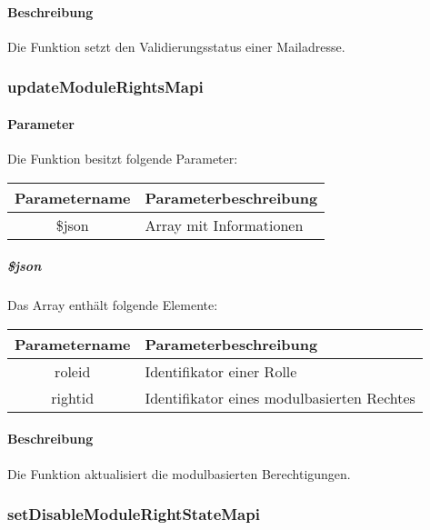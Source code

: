 \paragraph{Beschreibung} Die Funktion setzt den Validierungsstatus einer Mailadresse.
\subsubsection{updateModuleRightsMapi}
\paragraph{Parameter} Die Funktion besitzt folgende Parameter:
\begin{table}[H]
	\begin{tabular}{|c|p{11cm}|}
		\hline
		\textbf{Parametername} & \textbf{Parameterbeschreibung} \\ \hline
		\$json & Array mit Informationen \\ \hline
	\end{tabular}
\end{table}
\subparagraph{\$json}Das Array enthält folgende Elemente:
\begin{table}[H]
	\begin{tabular}{|c|p{11cm}|}
		\hline
		\textbf{Parametername} & \textbf{Parameterbeschreibung} \\ \hline
		roleid   & Identifikator einer Rolle \\ \hline
		rightid  & Identifikator eines modulbasierten Rechtes \\ \hline
	\end{tabular}
\end{table}
\paragraph{Beschreibung} Die Funktion aktualisiert die modulbasierten Berechtigungen.
\subsubsection{setDisableModuleRightStateMapi}
